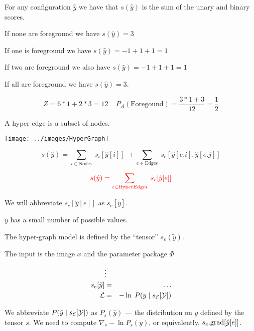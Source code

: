 
For any configuration $\hat{y}$ we have that $s(\hat{y})$ is the sum of the unary and binary scores.

\vfill
If none are foreground we have $s(\hat{y}) = 3$

\vfill
If one is foreground we have $s(\hat{y}) = -1 + 1+ 1 = 1$

\vfill
If two are foreground we also have $s(\hat{y}) = -1 + 1+ 1 = 1$

\vfill
If all are foreground we have $s(\hat{y}) = 3$.

\vfill
$$Z = 6*1 + 2*3 = 12\;\;\;\;P_A(\mathrm{Foregound}) = \frac{3*1 + 3}{12} = \frac{1}{2}$$




A hyper-edge is a subset of nodes.

\vfill
\centerline{\texttt{[image: ../images/HyperGraph]}}


$$s(\hat{y}) = \sum_{i \in \mathrm{Nodes}}\; s_i[\hat{y}[i]]\; + \sum_{e \in \mathrm{Edges}}\;s_e[\hat{y}[e.i],\hat{y}[e.j]]$$

\vfill

$${\color{red} s(\hat{y}) = \sum_{e \in \mathrm{HyperEdges}}  \; s_e[\hat{y}[e]]}$$



We will abbreviate $s_e[\hat{y}[e]]$ as {\color{red} $s_e[\tilde{y}]$}.

\vfill
{\color{red} $\tilde{y}$ has a small number of possible values.}

\vfill
The hyper-graph model is defined by the ``tensor'' {\color{red} $s_e(\tilde{y})$}.



The input is the image $x$ and the parameter package $\Phi$

\begin{eqnarray*}
 & \vdots & \\
s_e[\tilde{y}] & = & \ldots \\
{\cal L} & = & - \ln\; P(y\;|\;s_{\cal E}[{\cal Y}])
\end{eqnarray*}

\vfill We abbreviate $P(\hat{y}\;|\;s_{\cal E}[{\cal Y}])$ as {\color{red} $P_s(\hat{y})$} --- the distribution on $\hat{y}$ defined by the tensor $s$.
\vfill
We need to compute {\color{red} $\nabla_s -\ln P_s(y)$}, or equivalently, {\color{red} $s_e.\mathrm{grad}[\hat{y}[e]]$}.



